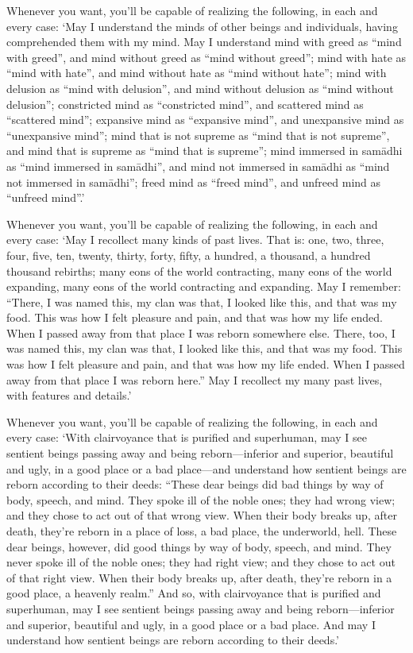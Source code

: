 \documentclass[12pt,openany]{book}%
\begin{document}
Whenever you want, you’ll be capable of realizing the following, in each and every case: ‘May I understand the minds of other beings and individuals, having comprehended them with my mind. May I understand mind with greed as “mind with greed”, and mind without greed as “mind without greed”; mind with hate as “mind with hate”, and mind without hate as “mind without hate”; mind with delusion as “mind with delusion”, and mind without delusion as “mind without delusion”; constricted mind as “constricted mind”, and scattered mind as “scattered mind”; expansive mind as “expansive mind”, and unexpansive mind as “unexpansive mind”; mind that is not supreme as “mind that is not supreme”, and mind that is supreme as “mind that is supreme”; mind immersed in \textsanskrit{samādhi} as “mind immersed in \textsanskrit{samādhi}”, and mind not immersed in \textsanskrit{samādhi} as “mind not immersed in \textsanskrit{samādhi}”; freed mind as “freed mind”, and unfreed mind as “unfreed mind”.’ 

Whenever you want, you’ll be capable of realizing the following, in each and every case: ‘May I recollect many kinds of past lives. That is: one, two, three, four, five, ten, twenty, thirty, forty, fifty, a hundred, a thousand, a hundred thousand rebirths; many eons of the world contracting, many eons of the world expanding, many eons of the world contracting and expanding. May I remember: “There, I was named this, my clan was that, I looked like this, and that was my food. This was how I felt pleasure and pain, and that was how my life ended. When I passed away from that place I was reborn somewhere else. There, too, I was named this, my clan was that, I looked like this, and that was my food. This was how I felt pleasure and pain, and that was how my life ended. When I passed away from that place I was reborn here.” May I recollect my many past lives, with features and details.’ 

Whenever you want, you’ll be capable of realizing the following, in each and every case: ‘With clairvoyance that is purified and superhuman, may I see sentient beings passing away and being reborn—inferior and superior, beautiful and ugly, in a good place or a bad place—and understand how sentient beings are reborn according to their deeds: “These dear beings did bad things by way of body, speech, and mind. They spoke ill of the noble ones; they had wrong view; and they chose to act out of that wrong view. When their body breaks up, after death, they’re reborn in a place of loss, a bad place, the underworld, hell. These dear beings, however, did good things by way of body, speech, and mind. They never spoke ill of the noble ones; they had right view; and they chose to act out of that right view. When their body breaks up, after death, they’re reborn in a good place, a heavenly realm.” And so, with clairvoyance that is purified and superhuman, may I see sentient beings passing away and being reborn—inferior and superior, beautiful and ugly, in a good place or a bad place. And may I understand how sentient beings are reborn according to their deeds.’ 
\end{document}
